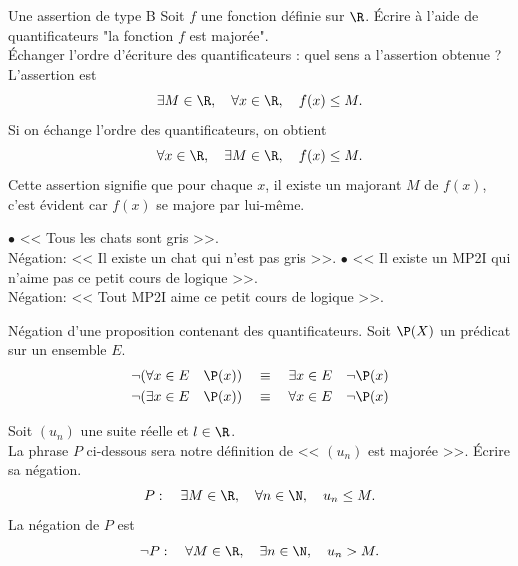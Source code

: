 \documentclass[11pt]{article}
\begin{document}
\pagebreak

\begin{ex}{Une assertion de type B}{}
    Soit $f$ une fonction définie sur $\R$. Écrire à l'aide de quantificateurs "la fonction $f$ est majorée".\\
    Échanger l'ordre d'écriture des quantificateurs : quel sens a l'assertion obtenue ?
    \tcblower
    L'assertion est
    \begin{equation*}
        \exists M \in \R, \quad \forall x \in \R, \quad f(x) \leq M.
    \end{equation*}
    Si on échange l'ordre des quantificateurs, on obtient
    \begin{equation*}
        \forall x \in \R, \quad \exists M \in \R, \quad f(x) \leq M.
    \end{equation*}
    Cette assertion signifie que pour chaque $x$, il existe un majorant $M$ de $f(x)$, c'est évident car $f(x)$ se majore par lui-même.
\end{ex}

\noindent$\bullet$ << Tous les chats sont gris >>.\\
Négation: << Il existe un chat qui n'est pas gris >>.\n
$\bullet$ << Il existe un MP2I qui n'aime pas ce petit cours de logique >>.\\
Négation: << Tout MP2I aime ce petit cours de logique >>.
\vspace{0.3cm}

\begin{thm}{Négation d'une proposition contenant des quantificateurs.}{}
    Soit $\P(X)$ un prédicat sur un ensemble $E$.
    \begin{equation*}
        \begin{aligned}
            \lnot(\forall x \in E \quad \P(x)) \quad &\equiv \quad \exists x \in E \quad \lnot \P(x)\\
            \lnot(\exists x \in E \quad \P(x)) \quad &\equiv \quad \forall x \in E \quad \lnot \P(x)
        \end{aligned}
    \end{equation*}
\end{thm}

\begin{ex}{}{}
    Soit $(u_n)$ une suite réelle et $l\in\R$.\\
    La phrase $P$ ci-dessous sera notre définition de << $(u_n)$ est majorée >>. Écrire sa négation.
    \begin{equation*}
        P: \quad \exists M\in\R,\quad\forall n\in\N,\quad u_n\leq M.
    \end{equation*}
    \tcblower
    La négation de $P$ est
    \begin{equation*}
        \lnot P: \quad \forall M\in\R,\quad\exists n\in\N,\quad u_n> M.
    \end{equation*}
\end{ex}
\end{document}
